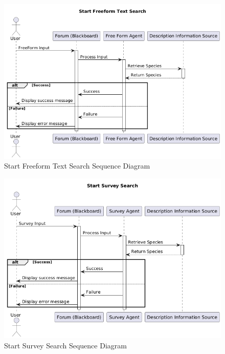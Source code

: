 \documentclass[]{article}
\numberwithin{figure}{section}
\begin{document}
\begin{figure}[h]
    \centering
    \includegraphics[scale=0.7]{StartFreeFormSearch_sequence.png}
    \caption{Start Freeform Text Search Sequence Diagram}
    \label{fig:ViewSavedReports_sequence}
\end{figure}
\clearpage

\begin{figure}[h]
    \centering
    \includegraphics[scale=0.7]{StartSurveySearch_sequence.png}
    \caption{Start Survey Search Sequence Diagram}
    \label{fig:ViewSavedReports_sequence}
\end{figure}
\clearpage
\end{document}
